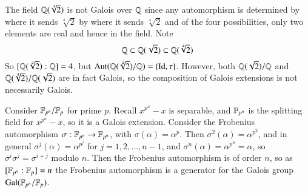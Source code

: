 \begin{example}
\begin{center}
    \end{center}
\end{example}


\begin{example}
    The field $\mathbb Q(\sqrt[4]{2})$ is not Galois over $\mathbb Q$ since any automorphism is determined by where it sends $\sqrt[4]{2}$ by where it sends $\sqrt[4]{2}$ and of the four possibilities, only two elements are real and hence in the field. Note \begin{equation*}
        \mathbb Q \subset \mathbb Q(\sqrt{2}) \subset \mathbb Q(\sqrt[4]{2})
    \end{equation*}
    So $[\mathbb Q(\sqrt[4]{2}):\mathbb Q] = 4$, but $\operatorname{Aut}(\mathbb Q(\sqrt[4]{2})/\mathbb Q) = \{\operatorname{Id}, \tau\}$. However, both $\mathbb Q(\sqrt{2})/\mathbb Q$ and $\mathbb Q(\sqrt[4]{2})/\mathbb Q(\sqrt{2})$ are in fact Galois, so the composition of Galois extensions is not necessarily Galois.
\end{example}

\begin{example}
    Consider $\mathbb F_{p^n}/\mathbb F_p$ for prime $p$. Recall $x^{p^n}-x$ is separable, and $\mathbb F_{p^n}$ is the splitting field for $x^{p^n}-x$, so it is a Galois extension. Consider the Frobenius automorphism $\sigma:\mathbb F_{p^n}\rightarrow \mathbb F_{p^n}$, with $\sigma(\alpha) = \alpha^p$. Then $\sigma^2(\alpha) = \alpha^{p^2}$, and in general $\sigma^j(\alpha) = \alpha^{p^j}$ for $j = 1,2,...,n-1$, and $\sigma^n(\alpha) = \alpha^{p^n} = \alpha$, so $\sigma^i\sigma^j = \sigma^{i+j}$ modulo $n$. Then the Frobenius automorphism is of order $n$, so as $[\mathbb F_{p^n}:\mathbb F_p] = n$ the Frobenius automorphism is a generator for the Galois group $\text{Gal}(\mathbb F_{p^n}/\mathbb F_p)$.
\end{example}







